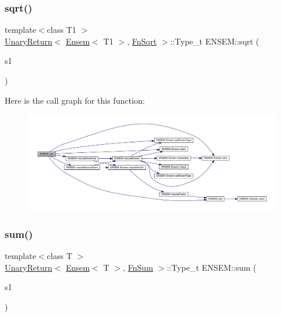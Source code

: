 \subsubsection{\texorpdfstring{sqrt()}{sqrt()}}
{\footnotesize\ttfamily template$<$class T1 $>$ \\
\mbox{\hyperlink{structENSEM_1_1UnaryReturn}{Unary\+Return}}$<$ \mbox{\hyperlink{classENSEM_1_1Ensem}{Ensem}}$<$ T1 $>$, \mbox{\hyperlink{structENSEM_1_1FnSqrt}{Fn\+Sqrt}} $>$\+::Type\+\_\+t E\+N\+S\+E\+M\+::sqrt (\begin{DoxyParamCaption}\item[{const \mbox{\hyperlink{classENSEM_1_1Ensem}{Ensem}}$<$ T1 $>$ \&}]{s1 }\end{DoxyParamCaption})\hspace{0.3cm}{\ttfamily [inline]}}

Here is the call graph for this function\+:\nopagebreak
\begin{figure}[H]
\begin{center}
\leavevmode
\includegraphics[width=350pt]{d1/d9e/group__eensem_gac8bfa621e2dd6c732c311e9ffafb6eaf_cgraph}
\end{center}
\end{figure}
\mbox{\label{group__eensem_gac055c3d3de5296fcc478482fc09633ce}} 
\subsubsection{\texorpdfstring{sum()}{sum()}}
{\footnotesize\ttfamily template$<$class T $>$ \\
\mbox{\hyperlink{structENSEM_1_1UnaryReturn}{Unary\+Return}}$<$ \mbox{\hyperlink{classENSEM_1_1Ensem}{Ensem}}$<$ T $>$, \mbox{\hyperlink{structENSEM_1_1FnSum}{Fn\+Sum}} $>$\+::Type\+\_\+t E\+N\+S\+E\+M\+::sum (\begin{DoxyParamCaption}\item[{const \mbox{\hyperlink{classENSEM_1_1Ensem}{Ensem}}$<$ T $>$ \&}]{s1 }\end{DoxyParamCaption})\hspace{0.3cm}{\ttfamily [inline]}}

